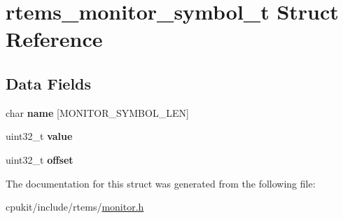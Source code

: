 \hypertarget{structrtems__monitor__symbol__t}{}\section{rtems\+\_\+monitor\+\_\+symbol\+\_\+t Struct Reference}
\label{structrtems__monitor__symbol__t}
\subsection*{Data Fields}
\begin{DoxyCompactItemize}
\item 
\mbox{\label{structrtems__monitor__symbol__t_a2b29779dd3b5efc7ad55853adf29d610}} 
char {\bfseries name} \mbox{[}M\+O\+N\+I\+T\+O\+R\+\_\+\+S\+Y\+M\+B\+O\+L\+\_\+\+L\+EN\mbox{]}
\item 
\mbox{\label{structrtems__monitor__symbol__t_a8fa4be99a3c6f8fba30ef39a427ea9ae}} 
uint32\+\_\+t {\bfseries value}
\item 
\mbox{\label{structrtems__monitor__symbol__t_a83685cf8b4a0cc958586094bd9370dcf}} 
uint32\+\_\+t {\bfseries offset}
\end{DoxyCompactItemize}


The documentation for this struct was generated from the following file\+:\begin{DoxyCompactItemize}
\item 
cpukit/include/rtems/\mbox{\hyperlink{monitor_8h}{monitor.\+h}}\end{DoxyCompactItemize}

